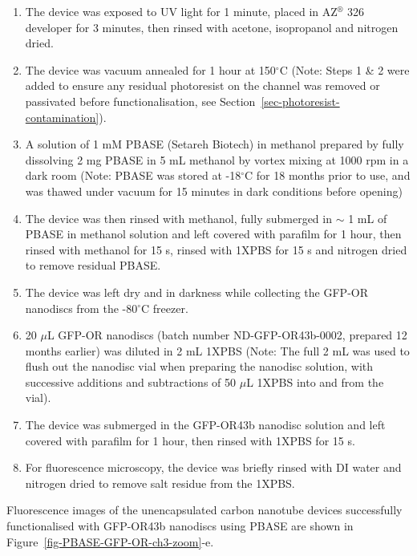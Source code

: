 \documentclass[
  a4paper,
]{scrbook}
\begin{document}
\begin{enumerate}
\def\labelenumi{\arabic{enumi}.}
\item
  The device was exposed to UV light for 1 minute, placed in
  AZ\(^\circledR\) 326 developer for 3 minutes, then rinsed with
  acetone, isopropanol and nitrogen dried.
\item
  The device was vacuum annealed for 1 hour at 150\(^\circ\)C (Note:
  Steps 1 \& 2 were added to ensure any residual photoresist on the
  channel was removed or passivated before functionalisation, see
  Section~\ref{sec-photoresist-contamination}).
\item
  A solution of 1 mM PBASE (Setareh Biotech) in methanol prepared by
  fully dissolving 2 mg PBASE in 5 mL methanol by vortex mixing at 1000
  rpm in a dark room (Note: PBASE was stored at -18\(^\circ\)C for 18
  months prior to use, and was thawed under vacuum for 15 minutes in
  dark conditions before opening)
\item
  The device was then rinsed with methanol, fully submerged in \(\sim\)
  1 mL of PBASE in methanol solution and left covered with parafilm for
  1 hour, then rinsed with methanol for 15 s, rinsed with 1XPBS for 15 s
  and nitrogen dried to remove residual PBASE.
\item
  The device was left dry and in darkness while collecting the GFP-OR
  nanodiscs from the -80\(^\circ\)C freezer.
\item
  20 \(\mu\)L GFP-OR nanodiscs (batch number ND-GFP-OR43b-0002, prepared
  12 months earlier) was diluted in 2 mL 1XPBS (Note: The full 2 mL was
  used to flush out the nanodisc vial when preparing the nanodisc
  solution, with successive additions and subtractions of 50 \(\mu\)L
  1XPBS into and from the vial).
\item
  The device was submerged in the GFP-OR43b nanodisc solution and left
  covered with parafilm for 1 hour, then rinsed with 1XPBS for 15 s.
\item
  For fluorescence microscopy, the device was briefly rinsed with DI
  water and nitrogen dried to remove salt residue from the 1XPBS.
\end{enumerate}

Fluorescence images of the unencapsulated carbon nanotube devices
successfully functionalised with GFP-OR43b nanodiscs using PBASE are
shown in Figure~\ref{fig-PBASE-GFP-OR-ch3-zoom}-e.
\end{document}

